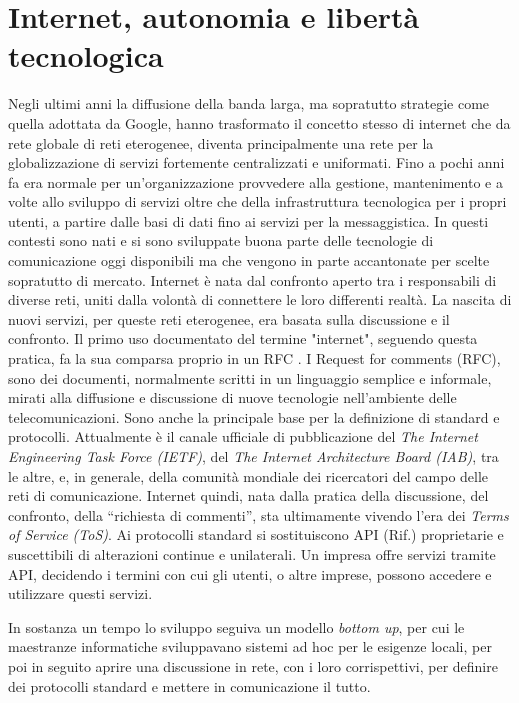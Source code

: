 \section{Internet, autonomia e libertà tecnologica}
Negli ultimi anni la diffusione della banda larga, ma sopratutto
strategie come quella adottata da Google, hanno trasformato il
concetto stesso di internet che da rete globale di reti eterogenee,
diventa principalmente una rete per la globalizzazione di servizi
fortemente centralizzati e uniformati. Fino a pochi anni fa era
normale per un'organizzazione provvedere alla gestione, mantenimento e
a volte allo sviluppo di servizi oltre che della infrastruttura
tecnologica per i propri utenti, a partire dalle basi di dati fino ai
servizi per la messaggistica. In questi contesti sono nati e si sono
sviluppate buona parte delle tecnologie di comunicazione oggi
disponibili ma che vengono in parte accantonate per scelte sopratutto
di mercato. Internet è nata dal confronto aperto tra i responsabili di
diverse reti, uniti dalla volontà di connettere le loro differenti
realtà. La nascita di nuovi servizi, per queste reti eterogenee, era
basata sulla discussione e il confronto. Il primo uso documentato del
termine "internet", seguendo questa pratica, fa la sua comparsa
proprio in un RFC \citep{RFC675}. I Request for comments (RFC), sono
dei documenti, normalmente scritti in un linguaggio semplice e
informale, mirati alla diffusione e discussione di nuove tecnologie
nell'ambiente delle telecomunicazioni. Sono anche la principale base
per la definizione di standard e protocolli. Attualmente è il canale
ufficiale di pubblicazione del \emph{The Internet Engineering Task
  Force (IETF)}, del \emph{The Internet Architecture Board (IAB)}, tra
le altre, e, in generale, della comunità mondiale dei ricercatori del
campo delle reti di comunicazione. Internet quindi, nata dalla pratica
della discussione, del confronto, della ``richiesta di commenti'', sta
ultimamente vivendo l'era dei \emph{Terms of Service (ToS)}. Ai
protocolli standard si sostituiscono API (Rif.) proprietarie e
suscettibili di alterazioni continue e unilaterali. Un impresa offre
servizi tramite API, decidendo i termini con cui gli utenti, o altre
imprese, possono accedere e utilizzare questi servizi.

In sostanza un tempo lo sviluppo seguiva un modello \emph{bottom up}, per
cui le maestranze informatiche sviluppavano sistemi ad hoc per le
esigenze locali, per poi in seguito aprire una discussione in rete,
con i loro corrispettivi, per definire dei protocolli standard e
mettere in comunicazione il tutto.

